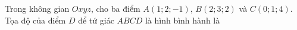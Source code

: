 \begin{ex}
Trong không gian $Oxyz$, cho ba điểm $A(1;2;-1)$, $B(2;3;2)$ và $C(0;1;4)$. Tọa độ của điểm $D$ để tứ giác $ABCD$ là hình bình hành là
\end{ex}
